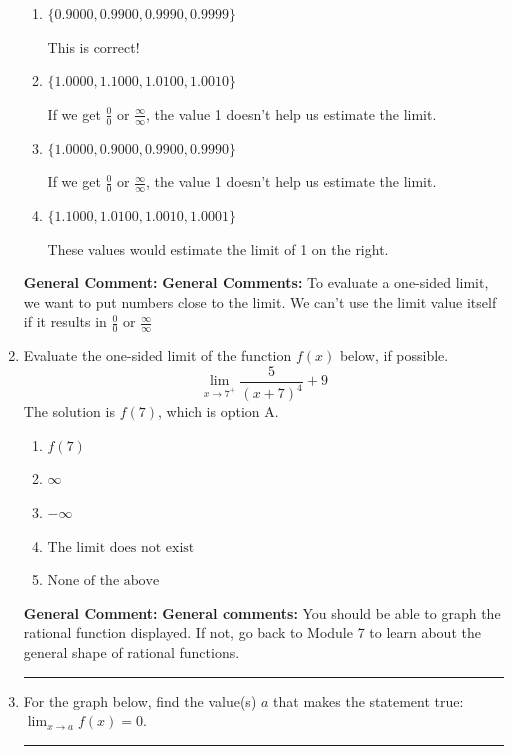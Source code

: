 \documentclass{extbook}[14pt]
\newcommand{\litem}[1]{\item #1

\rule{\textwidth}{0.4pt}}
\begin{document}
\begin{enumerate}
{\begin{enumerate}[label=\Alph*.]
These values would estimate the limit at the point and not a one-sided limit.
\item \( \{ 0.9000, 0.9900, 0.9990, 0.9999 \} \)

This is correct!
\item \( \{ 1.0000, 1.1000, 1.0100, 1.0010 \} \)

If we get $\frac{0}{0}$ or $\frac{\infty}{\infty}$, the value 1 doesn't help us estimate the limit.
\item \( \{ 1.0000, 0.9000, 0.9900, 0.9990 \} \)

If we get $\frac{0}{0}$ or $\frac{\infty}{\infty}$, the value 1 doesn't help us estimate the limit.
\item \( \{ 1.1000, 1.0100, 1.0010, 1.0001 \} \)

These values would estimate the limit of 1 on the right.
\end{enumerate}

\textbf{General Comment:} \textbf{General Comments:} To evaluate a one-sided limit, we want to put numbers close to the limit. We can't use the limit value itself if it results in $\frac{0}{0}$ or $\frac{\infty}{\infty}$
}
\litem{
Evaluate the one-sided limit of the function $f(x)$ below, if possible.
\[ \lim_{x \rightarrow 7^+} \frac{5}{(x+7)^4}+9 \]The solution is \( f(7) \), which is option A.\begin{enumerate}[label=\Alph*.]
\item \( f(7) \)


\item \( \infty \)


\item \( -\infty \)


\item \( \text{The limit does not exist} \)


\item \( \text{None of the above} \)


\end{enumerate}

\textbf{General Comment:} \textbf{General comments:} You should be able to graph the rational function displayed. If not, go back to Module 7 to learn about the general shape of rational functions.
}
\litem{
For the graph below, find the value(s) $a$ that makes the statement true: $ \displaystyle \lim_{x \rightarrow a} f(x) = 0$.

}
\end{enumerate}
\end{document}
